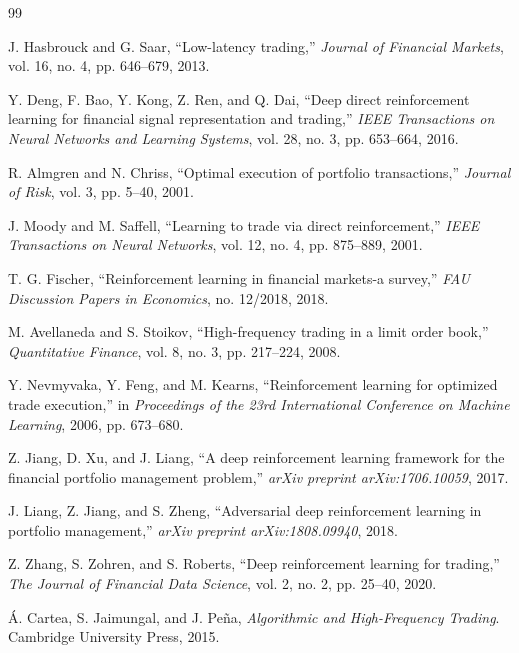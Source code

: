 \documentclass[11pt,a4paper]{article}
\begin{document}
\begin{thebibliography}{99}

J. Hasbrouck and G. Saar, ``Low-latency trading,'' \emph{Journal of Financial Markets}, vol. 16, no. 4, pp. 646--679, 2013.

Y. Deng, F. Bao, Y. Kong, Z. Ren, and Q. Dai, ``Deep direct reinforcement learning for financial signal representation and trading,'' \emph{IEEE Transactions on Neural Networks and Learning Systems}, vol. 28, no. 3, pp. 653--664, 2016.

R. Almgren and N. Chriss, ``Optimal execution of portfolio transactions,'' \emph{Journal of Risk}, vol. 3, pp. 5--40, 2001.

J. Moody and M. Saffell, ``Learning to trade via direct reinforcement,'' \emph{IEEE Transactions on Neural Networks}, vol. 12, no. 4, pp. 875--889, 2001.

T. G. Fischer, ``Reinforcement learning in financial markets-a survey,'' \emph{FAU Discussion Papers in Economics}, no. 12/2018, 2018.

M. Avellaneda and S. Stoikov, ``High-frequency trading in a limit order book,'' \emph{Quantitative Finance}, vol. 8, no. 3, pp. 217--224, 2008.

Y. Nevmyvaka, Y. Feng, and M. Kearns, ``Reinforcement learning for optimized trade execution,'' in \emph{Proceedings of the 23rd International Conference on Machine Learning}, 2006, pp. 673--680.

Z. Jiang, D. Xu, and J. Liang, ``A deep reinforcement learning framework for the financial portfolio management problem,'' \emph{arXiv preprint arXiv:1706.10059}, 2017.

J. Liang, Z. Jiang, and S. Zheng, ``Adversarial deep reinforcement learning in portfolio management,'' \emph{arXiv preprint arXiv:1808.09940}, 2018.

Z. Zhang, S. Zohren, and S. Roberts, ``Deep reinforcement learning for trading,'' \emph{The Journal of Financial Data Science}, vol. 2, no. 2, pp. 25--40, 2020.

{\'{A}}. Cartea, S. Jaimungal, and J. Pe{\~{n}}a, \emph{Algorithmic and High-Frequency Trading}. Cambridge University Press, 2015.


\end{thebibliography}
\end{document}
